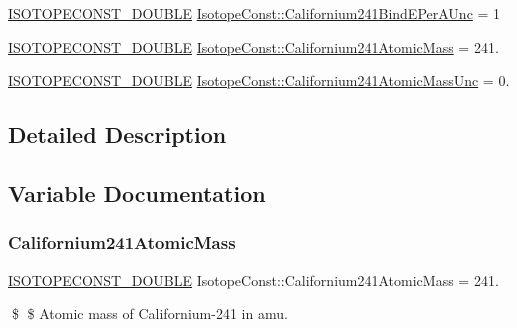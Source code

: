 \begin{DoxyCompactItemize}
\mbox{\hyperlink{group___isotope_const-_macros_ga8f45a7272ce02c0b4c65c44636ed719a}{I\+S\+O\+T\+O\+P\+E\+C\+O\+N\+S\+T\+\_\+\+D\+O\+U\+B\+LE}} \mbox{\hyperlink{group___isotope_const-_californium-_cf241_gaff796dfd3f46a22a07a8c0ef280242c7}{Isotope\+Const\+::\+Californium241\+Bind\+E\+Per\+A\+Unc}} = 1
\item 
\mbox{\hyperlink{group___isotope_const-_macros_ga8f45a7272ce02c0b4c65c44636ed719a}{I\+S\+O\+T\+O\+P\+E\+C\+O\+N\+S\+T\+\_\+\+D\+O\+U\+B\+LE}} \mbox{\hyperlink{group___isotope_const-_californium-_cf241_gadb3612dccb2639a5f8eae1ecdd7e18d8}{Isotope\+Const\+::\+Californium241\+Atomic\+Mass}} = 241.
\item 
\mbox{\hyperlink{group___isotope_const-_macros_ga8f45a7272ce02c0b4c65c44636ed719a}{I\+S\+O\+T\+O\+P\+E\+C\+O\+N\+S\+T\+\_\+\+D\+O\+U\+B\+LE}} \mbox{\hyperlink{group___isotope_const-_californium-_cf241_gae5d4a71bca685d6c45fbc8022d72cc84}{Isotope\+Const\+::\+Californium241\+Atomic\+Mass\+Unc}} = 0.
\end{DoxyCompactItemize}


\subsection{Detailed Description}


\subsection{Variable Documentation}
\mbox{\label{group___isotope_const-_californium-_cf241_gadb3612dccb2639a5f8eae1ecdd7e18d8}} 
\subsubsection{\texorpdfstring{Californium241\+Atomic\+Mass}{Californium241AtomicMass}}
{\footnotesize\ttfamily \mbox{\hyperlink{group___isotope_const-_macros_ga8f45a7272ce02c0b4c65c44636ed719a}{I\+S\+O\+T\+O\+P\+E\+C\+O\+N\+S\+T\+\_\+\+D\+O\+U\+B\+LE}} Isotope\+Const\+::\+Californium241\+Atomic\+Mass = 241.}

\$ \$ Atomic mass of Californium-\/241 in amu. \mbox{\label{group___isotope_const-_californium-_cf241_gae5d4a71bca685d6c45fbc8022d72cc84}} 
